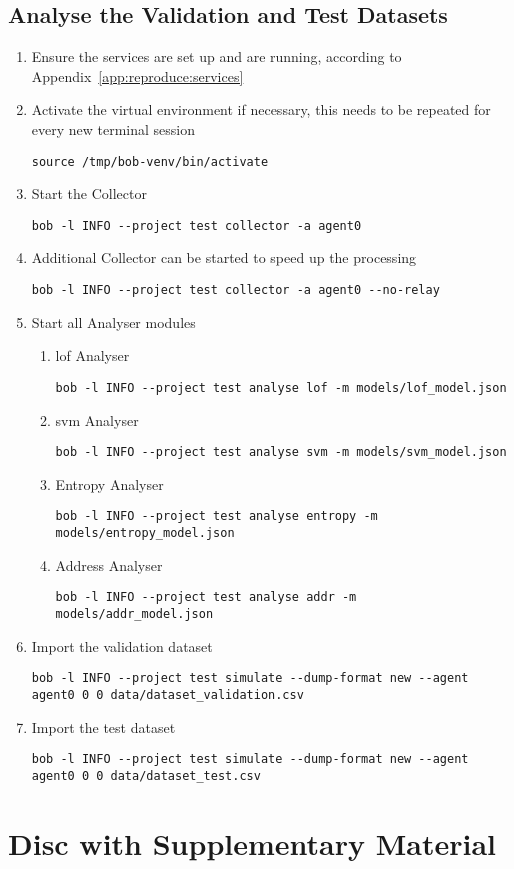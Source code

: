 \section{Analyse the Validation and Test Datasets}
\label{app:reproduce:run}

\begin{enumerate}
	\item Ensure the services are set up and are running, according to Appendix~\ref{app:reproduce:services}
	\item Activate the virtual environment if necessary, this needs to be repeated for every new terminal session
\begin{lstlisting}
source /tmp/bob-venv/bin/activate
\end{lstlisting}
	\item Start the Collector
\begin{lstlisting}
bob -l INFO --project test collector -a agent0
\end{lstlisting}
	\item Additional Collector can be started to speed up the processing
\begin{lstlisting}
bob -l INFO --project test collector -a agent0 --no-relay
\end{lstlisting}
	\item Start all Analyser modules
		\begin{enumerate}
			\item \gls{lof} Analyser
\begin{lstlisting}
bob -l INFO --project test analyse lof -m models/lof_model.json
\end{lstlisting}
			\item \gls{svm} Analyser
\begin{lstlisting}
bob -l INFO --project test analyse svm -m models/svm_model.json
\end{lstlisting}
			\item Entropy Analyser
\begin{lstlisting}
bob -l INFO --project test analyse entropy -m models/entropy_model.json
\end{lstlisting}
			\item Address Analyser
\begin{lstlisting}
bob -l INFO --project test analyse addr -m models/addr_model.json
\end{lstlisting}
		\end{enumerate}
	\item Import the validation dataset
\begin{lstlisting}
bob -l INFO --project test simulate --dump-format new --agent agent0 0 0 data/dataset_validation.csv
\end{lstlisting}
	\item Import the test dataset
\begin{lstlisting}
bob -l INFO --project test simulate --dump-format new --agent agent0 0 0 data/dataset_test.csv
\end{lstlisting}
\end{enumerate}

\begin{comment}
\begin{lstlisting}
\end{lstlisting}
\end{comment}

\chapter{Disc with Supplementary Material}
\label{app:disk}